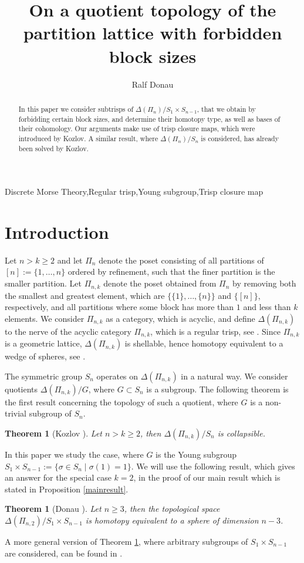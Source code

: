 \documentclass{elsarticle}
\newtheorem{thm}[df]{Theorem}
\begin{document}
\begin{frontmatter}
\title{On a quotient topology of the partition lattice with forbidden block sizes}
\author[ruelle]{Ralf Donau}
\address[ruelle]{Fachbereich Mathematik, Universit\"at Bremen, Bibliothekstra\ss e 1, 28359 Bremen, Germany}
\begin{abstract}
In this paper we consider subtrisps of $\Delta(\Pi_n)/S_1\times S_{n-1}$, that we obtain by forbidding certain block sizes, and determine their homotopy type, as well as bases of their cohomology. Our arguments make use of trisp closure maps, which were introduced by Kozlov. A similar result, where $\Delta(\Pi_n)/S_n$ is considered, has already been solved by Kozlov.
\end{abstract}
\begin{keyword}
Discrete Morse Theory\sep Regular trisp\sep Young subgroup\sep Trisp closure map
\end{keyword}
\end{frontmatter}
\section{Introduction}
Let $n>k\geq 2$ and let $\Pi_n$ denote the poset consisting of all partitions of $[n]:=\{1,\dots,n\}$ ordered by refinement, such that the finer partition is the smaller partition. Let $\Pi_{n,k}$ denote the poset obtained from $\Pi_n$ by removing both the smallest and greatest element, which are $\{\{1\},\dots,\{n\}\}$ and $\{[n]\}$, respectively, and all partitions where some block has more than $1$ and less than $k$ elements. We consider $\Pi_{n,k}$ as a category, which is acyclic, and define $\Delta(\Pi_{n,k})$ to the nerve of the acyclic category $\Pi_{n,k}$, which is a regular trisp, see \cite[Chapter 10]{buch}. Since $\Pi_{n,k}$ is a geometric lattice, $\Delta(\Pi_{n,k})$ is shellable, hence homotopy equivalent to a wedge of spheres, see \cite{bjoern}.

The symmetric group $S_n$ operates on $\Delta(\Pi_{n,k})$ in a natural way. We consider quotients $\Delta(\Pi_{n,k})/G$, where $G\subset S_n$ is a subgroup. The following theorem is the first result concerning the topology of such a quotient, where $G$ is a non-trivial subgroup of $S_n$.
\begin{thm}[Kozlov \cite{kozthm}]
Let $n>k\geq 2$, then $\Delta(\Pi_{n,k})/S_n$ is collapsible.
\end{thm}
In this paper we study the case, where $G$ is the Young subgroup $S_1\times S_{n-1}:=\{\sigma\in S_n\mid\sigma(1)=1\}$. We will use the following result, which gives an answer for the special case $k=2$, in the proof of our main result which is stated in Proposition \ref{mainresult}.
\begin{thm}[Donau \cite{donau}]
\label{rdthm}
Let $n\geq3$, then the topological space $\Delta(\Pi_{n,2})/S_1\times S_{n-1}$ is homotopy equivalent to a sphere of dimension $n-3$.
\end{thm}
A more general version of Theorem \ref{rdthm}, where arbitrary subgroups of $S_1\times S_{n-1}$ are considered, can be found in \cite{donau}.
\end{document}
